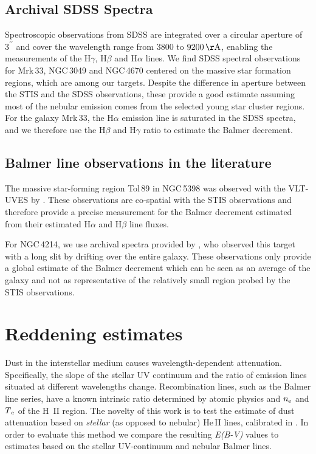 \documentclass[]{aastex63}
\begin{document}
\subsection{Archival SDSS Spectra}\label{sssect:sdss}
Spectroscopic observations from SDSS are integrated over a circular aperture of $3^{\prime\prime}$ and cover the wavelength range from 3800 to $9200\,{\rm \AA}$, enabling the measurements of the H$\gamma$, H$\beta$ and H$\alpha$ lines. 
We find SDSS spectral observations for Mrk\,33, NGC\,3049 and NGC\,4670 centered on the massive star formation regions, which are among our targets. 
Despite the difference in aperture between the STIS and the SDSS observations, these provide a good estimate assuming most of the nebular emission comes from the selected young star cluster regions. For the galaxy Mrk\,33, the H$\alpha$ emission line is saturated in the SDSS spectra, and we therefore use the H$\beta$ and H$\gamma$ ratio to estimate the Balmer decrement.

\subsection{Balmer line observations in the literature}\label{sssect:literature}
The massive star-forming region Tol\,89 in NGC\,5398 was observed with the VLT-UVES by \citet{sidoli_massive_2006}. These observations are co-spatial with the STIS observations and therefore provide a precise measurement for the Balmer decrement estimated from their estimated H$\alpha$ and H$\beta$ line fluxes.

For NGC\,4214, we use archival spectra provided by \citet{moustakas_integrated_2006}, who observed this target with a long slit by drifting over the entire galaxy. These observations only provide a global estimate of the Balmer decrement which can be seen as an average of the galaxy and not as representative of the relatively small region probed by the STIS observations.


\section{Reddening estimates}\label{sect:reddening}
Dust in the interstellar medium causes wavelength-dependent attenuation. Specifically, the slope of the stellar UV continuum and the ratio of emission lines situated at different wavelengths change. Recombination lines, such as the Balmer line series, have a known intrinsic ratio determined by atomic physics and $n{\rm_e}$ and $T{\rm_e}$ of the H~II region.  
The novelty of this work is to test the estimate of dust attenuation based on \textit{stellar} (as opposed to nebular) He\,II lines, calibrated in  \cite{leitherer_he_2019}. In order to evaluate this method we compare the resulting {\it E(B-V)} values to estimates based on the stellar UV-continuum and nebular Balmer lines.
\end{document}
